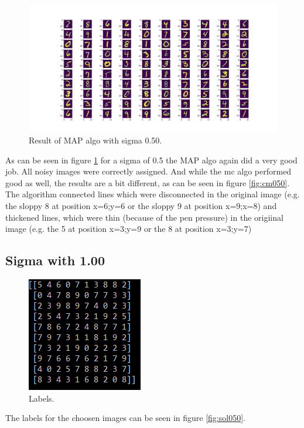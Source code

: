 \documentclass{article}
\begin{document}
\begin{figure}[h]
  \includegraphics[width=\linewidth]{sigma_050_map.png}
  \caption{Result of MAP algo with sigma 0.50.}
  \label{fig:map050}
\end{figure}

As can be seen in figure \ref{fig:map050} for a sigma of 0.5 the MAP algo again did a very good job. All noisy images were correctly assigned. And while the mc algo performed good as well, the results are a bit different, as can be seen in figure \ref{fig:cm050}. The algorithm connected lines which were disconnected in the original image (e.g. the sloppy 8 at position x=6;y=6 or the sloppy 9 at position x=9;x=8) and thickened lines, which were thin (because of the pen pressure) in the origiinal image (e.g. the 5 at position x=3;y=9 or the 8 at position x=3;y=7)
\pagebreak
\subsection{Sigma with 1.00}
\begin{figure}[!h]
  \includegraphics[width=\linewidth]{sigma_100_sol.png}
  \caption{Labels.}
  \label{fig:sol100}
\end{figure}
The labels for the choosen images can be seen in figure \ref{fig:sol050}.
\end{document}
